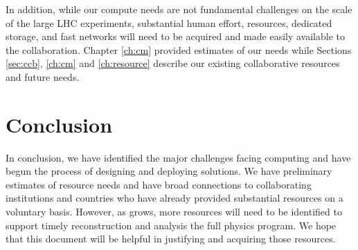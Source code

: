 \documentclass[../main-v1.tex]{subfiles}
\begin{document}
\begin{description}
In addition, while our compute needs are not fundamental challenges on the scale of the large LHC experiments, substantial human effort,  resources, dedicated storage, and fast networks will need to be acquired and made easily available to the collaboration.  Chapter \ref{ch:cm} provided estimates of our needs while Sections  \ref{sec:ccb}, \ref{ch:cm} and \ref{ch:resource} describe our existing collaborative resources and future needs. 


\end{description}

\section{Conclusion}

In conclusion, we have identified the major challenges facing  computing and have begun the process of designing and deploying solutions. We have preliminary estimates of resource needs and have broad connections to collaborating institutions and countries who have already provided substantial resources on a voluntary basis. However, as  grows, more resources will need to be identified to support timely reconstruction and analysis the full physics program.  We hope that this document will be helpful in justifying and acquiring those resources. 
\end{document}
